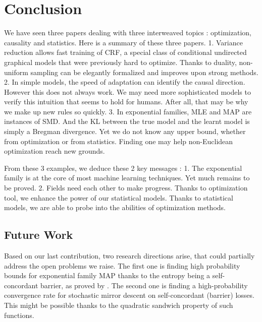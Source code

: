 \chapter{Conclusion}
\label{chap:discussion}


We have seen three papers dealing with three interweaved topics : optimization, causality and statistics. 
Here is a summary of these three papers.
1. Variance reduction allows fast training of CRF, a special class of conditional undirected graphical models that were previously hard to optimize.
Thanks to duality, non-uniform sampling can be elegantly formalized and improves upon strong methods.
2. In simple models, the speed of adaptation can identify the causal direction. However this does not always work. We may need more sophisticated models to verify this intuition that seems to hold for humans. After all, that may be why we make up new rules so quickly.
3. In exponential families, MLE and MAP are instances of SMD. And the KL between the true model and the learnt model is simply a Bregman divergence. Yet we do not know any upper bound, whether from optimization or from statistics. Finding one may help non-Euclidean optimization reach new grounds.


From these 3 examples, we deduce these 2 key messages : 
1. The exponential family is at the core of most machine learning techniques. Yet much remains to be proved.
2. Fields need each other to make progress. Thanks to optimization tool, we enhance the power of our statistical models. Thanks to statistical models, we are able to probe into the abilities of optimization methods.


\section{Future Work}
Based on our last contribution, two research directions arise, that could partially address the open problems we raise.
The first one is finding high probability bounds for exponential family MAP thanks to the entropy being a self-concordant barrier, as proved by \citep{bubeck2015entropic}.
The second one is finding a high-probability convergence rate for stochastic mirror descent on self-concordant (barrier) losses. This might be possible thanks to the quadratic sandwich property of such functions. 